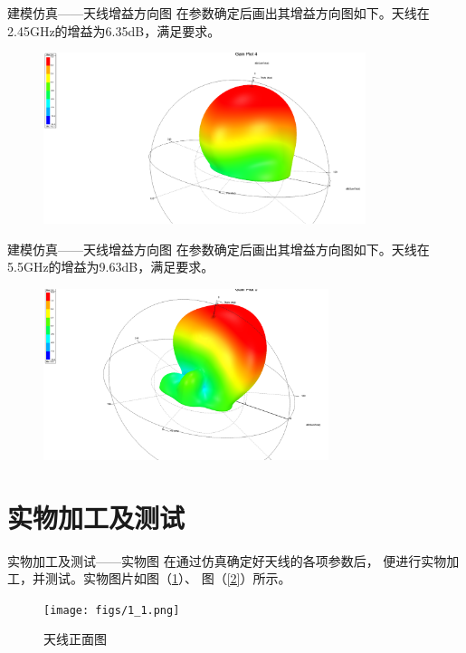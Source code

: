\documentclass[10pt]{beamer}
\begin{document}
\begin{frame}{建模仿真——{\normalsize 天线增益方向图}}
	\qquad 在参数确定后画出其增益方向图如下。天线在2.45GHz的增益为6.35dB，满足要求。
	\begin{figure}[htbp]
		\centering
		\includegraphics[height=5cm]{figs/15.png}
	\end{figure}
\end{frame}

\begin{frame}{建模仿真——{\normalsize 天线增益方向图}}
	\qquad 在参数确定后画出其增益方向图如下。天线在5.5GHz的增益为9.63dB，满足要求。
	\begin{figure}[htbp]
		\centering
		\includegraphics[height=5cm]{figs/14.png}
	\end{figure}
\end{frame}


\section{实物加工及测试}
\begin{frame}{实物加工及测试——{\normalsize 实物图}}
	\qquad 在通过仿真确定好天线的各项参数后，
	便进行实物加工，并测试。实物图片如图（\ref{1}）、
	图（\ref{2}）所示。
	\begin{figure}[htbp]
		\centering
		\texttt{[image: figs/1\_1.png]}
		\caption{天线正面图}
		\label{1}
	\end{figure}
\end{frame}
\end{document}
